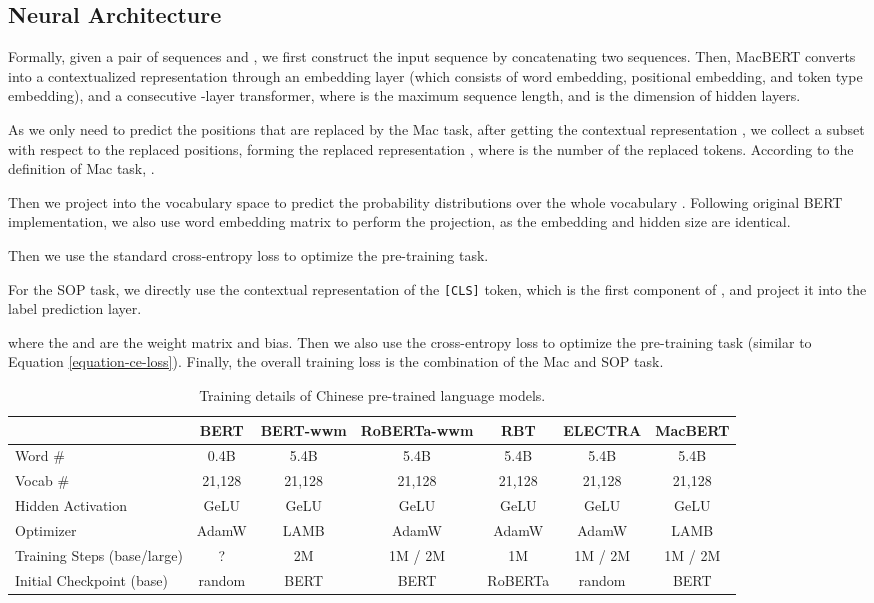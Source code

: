\documentclass[journal]{IEEEtran}
\begin{document}
\begin{CJK*}{UTF8}{gbsn}
\subsection{Neural Architecture}
Formally, given a pair of sequences  and , we first construct the input sequence  by concatenating two sequences.
Then, MacBERT converts  into a contextualized representation  through an embedding layer (which consists of word embedding, positional embedding, and token type embedding), and a consecutive -layer transformer, where  is the maximum sequence length, and  is the dimension of hidden layers.


As we only need to predict the positions that are replaced by the Mac task, after getting the contextual representation , we collect a subset with respect to the replaced positions, forming the replaced representation , where  is the number of the replaced tokens.
According to the definition of Mac task, .

Then we project  into the vocabulary space to predict the probability distributions  over the whole vocabulary .
Following original BERT implementation, we also use word embedding matrix  to perform the projection, as the embedding and hidden size are identical.


Then we use the standard cross-entropy loss to optimize the pre-training task.


For the SOP task, we directly use the contextual representation of the {\tt [CLS]} token, which is the first component of , and project it into the label prediction layer.

where the  and  are the weight matrix and bias.
Then we also use the cross-entropy loss to optimize the pre-training task (similar to Equation \ref{equation-ce-loss}).
Finally, the overall training loss is the combination of the Mac and SOP task.




\begin{table*}[htbp]
\caption{\label{comparison-base} Training details of Chinese pre-trained language models.}
\begin{center}
\begin{tabular}{l c c c c c c}
\toprule
 	& \bf BERT & \bf BERT-wwm & \bf RoBERTa-wwm & \bf RBT & \bf ELECTRA & \bf MacBERT \\
\midrule
Word \#			& 0.4B & 5.4B  & 5.4B & 5.4B & 5.4B & 5.4B \\
Vocab \#			& 21,128 & 21,128 & 21,128 & 21,128 & 21,128 & 21,128 \\
Hidden Activation	& GeLU & GeLU  & GeLU & GeLU & GeLU & GeLU \\
Optimizer 			& AdamW & LAMB & AdamW & AdamW & AdamW & LAMB \\
Training Steps (base/large)		& ? & 2M & 1M / 2M & 1M & 1M / 2M & 1M / 2M \\
Initial Checkpoint (base) & random & BERT & BERT & RoBERTa & random & BERT \\
\bottomrule
\end{tabular}
\end{center}
\end{table*}



\end{CJK*}
\end{document}
